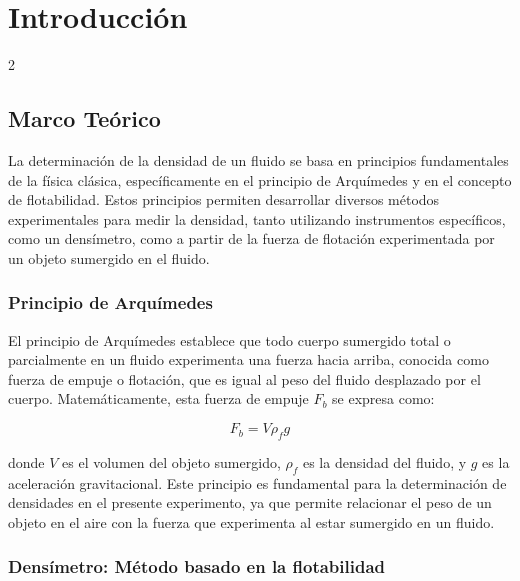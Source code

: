 \documentclass[10pt,letterpaper]{article}
\begin{document}
    \vspace{1cm}

    \hline
	
    \section{Introducción}

    \hline
    
    \begin{multicols}{2}

    \subsection*{Marco Teórico}

La determinación de la densidad de un fluido se basa en principios fundamentales de la física clásica, específicamente en el principio de Arquímedes y en el concepto de flotabilidad. Estos principios permiten desarrollar diversos métodos experimentales para medir la densidad, tanto utilizando instrumentos específicos, como un densímetro, como a partir de la fuerza de flotación experimentada por un objeto sumergido en el fluido.

\subsubsection*{Principio de Arquímedes}

El principio de Arquímedes establece que todo cuerpo sumergido total o parcialmente en un fluido experimenta una fuerza hacia arriba, conocida como fuerza de empuje o flotación, que es igual al peso del fluido desplazado por el cuerpo. Matemáticamente, esta fuerza de empuje \( F_b \) se expresa como:

\begin{equation}
F_b = V \rho_f g
\end{equation}

donde \( V \) es el volumen del objeto sumergido, \( \rho_f \) es la densidad del fluido, y \( g \) es la aceleración gravitacional. Este principio es fundamental para la determinación de densidades en el presente experimento, ya que permite relacionar el peso de un objeto en el aire con la fuerza que experimenta al estar sumergido en un fluido.

\subsubsection*{Densímetro: Método basado en la flotabilidad}


\end{multicols}
\end{document}
